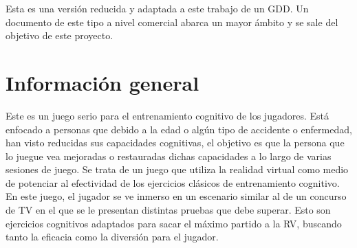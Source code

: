 
\pagestyle{fancy}
\fancyhead[LE,RO]{\thepage}
\fancyhead[LO]{\nouppercase{\rightmark}}

\label{sec:apendice:GDD}



\minitoc

Esta es una versión reducida y adaptada a este trabajo de un GDD. Un documento de este tipo a nivel comercial abarca un mayor ámbito y se sale del objetivo de este proyecto.

\section{Información general}


Este es un juego serio para el entrenamiento cognitivo de los jugadores. Está enfocado a personas que debido a la edad o algún tipo de accidente o enfermedad, han visto reducidas sus capacidades cognitivas, el objetivo es que la persona que lo juegue vea mejoradas o restauradas dichas capacidades a lo largo de varias sesiones de juego. 
Se trata de un juego que utiliza la realidad virtual como medio de potenciar al efectividad de los ejercicios clásicos de entrenamiento cognitivo. En este juego, el jugador se ve inmerso en un escenario similar al de un concurso de TV en el que se le presentan distintas pruebas que debe superar. Esto son ejercicios cognitivos adaptados para sacar el máximo partido a la RV, buscando tanto la eficacia como la diversión para el jugador. 




